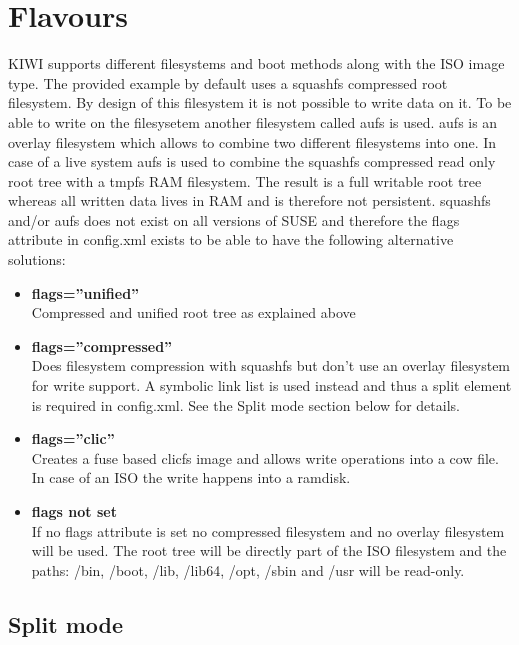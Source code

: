 \section{Flavours}

KIWI supports different filesystems and boot methods along with the
ISO image type. The provided example by default uses a squashfs compressed
root filesystem. By design of this filesystem it is not possible to write
data on it. To be able to write on the filesysetem another filesystem called
aufs is used. aufs is an overlay filesystem which allows to combine two
different filesystems into one. In case of a live system aufs is used
to combine the squashfs compressed read only root tree with a tmpfs
RAM filesystem. The result is a full writable root tree whereas all
written data lives in RAM and is therefore not persistent. squashfs and/or
aufs does not exist on all versions of SUSE and therefore the flags
attribute in config.xml exists to be able to have the following
alternative solutions:

\begin{itemize}
\item \textbf{flags=''unified''}\\
      Compressed and unified root tree as explained above
\item \textbf{flags=''compressed''}\\
      Does filesystem compression with squashfs but don't use an
      overlay filesystem for write support. A symbolic link list is used
      instead and thus a split element is required in config.xml.
      See the Split mode section below for details.
\item \textbf{flags=''clic''}\\
      Creates a fuse based clicfs image and allows write operations
      into a cow file. In case of an ISO the write happens into a
      ramdisk.
\item \textbf{flags not set}\\
      If no flags attribute is set no compressed filesystem and no overlay
      filesystem will be used. The root tree will be directly part of
      the ISO filesystem and the paths: /bin, /boot, /lib, /lib64, /opt,
      /sbin and /usr will be read-only.
\end{itemize}

\subsection{Split mode}

